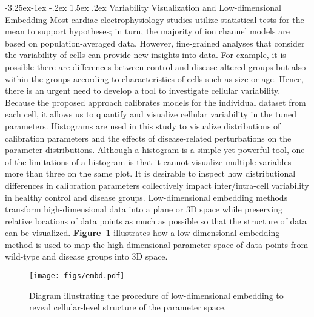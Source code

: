 \documentclass[11pt]{article}
\makeatletter
\renewcommand\subsection{\@startsection{subsection}{2}{\z@}%
                                     {-3.25ex\@plus -1ex \@minus -.2ex}%
                                     {1.5ex \@plus .2ex}%
                                     {\normalfont\fontfamily{phv}\fontsize{14}{17}\bfseries}}
\makeatother
\begin{document}
\subsection{Variability Visualization and Low-dimensional Embedding}
Most cardiac electrophysiology studies utilize statistical tests for the mean to support hypotheses; in turn, the majority of ion channel models are based on population-averaged data. However, fine-grained analyses that consider the variability of cells can provide new insights into data. For example, it is possible there are differences between control and disease-altered groups but also within the groups according to characteristics of cells such as size or age. Hence, there is an urgent need to develop a tool to investigate cellular variability. Because the proposed approach calibrates models for the individual dataset from each cell, it allows us to quantify and visualize cellular variability in the tuned parameters. Histograms are used in this study to visualize distributions of calibration parameters and the effects of disease-related perturbations on the parameter distributions. Although a histogram is a simple yet powerful tool, one of the limitations of a histogram is that it cannot visualize multiple variables more than three on the same plot. It is desirable to inspect how distributional differences in calibration parameters collectively impact inter/intra-cell variability in healthy control and disease groups. Low-dimensional embedding methods transform high-dimensional data into a plane or 3D space while preserving relative locations of data points as much as possible so that the structure of data can be visualized. \textbf{Figure~\ref{fig:embd}} illustrates how a low-dimensional embedding method is used to map the high-dimensional parameter space of data points from wild-type and disease groups into 3D space.  
\begin{figure}[!ht]
    \centering
    \texttt{[image: figs/embd.pdf]}
    \caption{Diagram illustrating the procedure of low-dimensional embedding to reveal cellular-level structure of the parameter space.}
    \label{fig:embd}
\end{figure}
\end{document}
